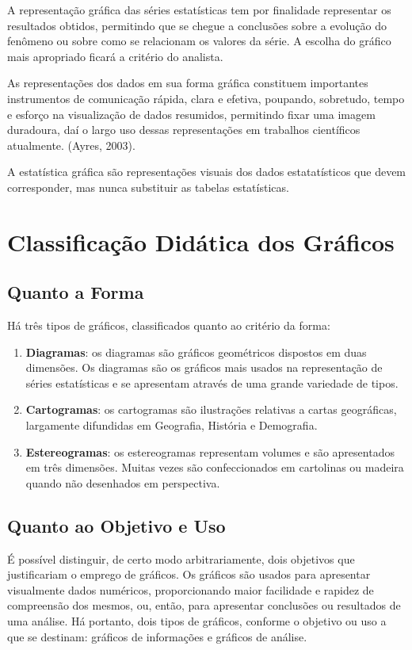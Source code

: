 A representação gráfica das séries estatísticas tem por finalidade representar os resultados obtidos, permitindo que se chegue a conclusões sobre a evolução do fenômeno ou sobre como se relacionam os valores da série. A escolha do gráfico mais apropriado ficará a critério do analista.\vskip0.3cm

As representações dos dados em sua forma gráfica constituem importantes instrumentos de comunicação rápida, clara e efetiva, poupando, sobretudo, tempo e esforço na visualização de dados resumidos, permitindo fixar uma imagem duradoura, daí o largo uso dessas representações em trabalhos científicos atualmente. (Ayres, 2003).\vskip0.3cm

A estatística gráfica são representações visuais dos dados estatatísticos que devem corresponder, mas nunca substituir as tabelas estatísticas.


\newpage
\section{Classificação Didática dos Gráficos}
\subsection{Quanto a Forma}

Há três tipos de gráficos, classificados quanto ao critério da forma:

\begin{enumerate}
  \item \textbf{Diagramas}: os diagramas são gráficos geométricos dispostos em duas dimensões. Os diagramas são os gráficos mais usados na representação de séries estatísticas e se  apresentam através de uma grande variedade de tipos.
  \item \textbf{Cartogramas}: os cartogramas são ilustrações relativas a cartas geográficas, largamente difundidas em Geografia, História e Demografia.
  \item \textbf{Estereogramas}: os estereogramas representam volumes e são apresentados em três dimensões. Muitas vezes são confeccionados em cartolinas ou madeira quando não desenhados em perspectiva.
\end{enumerate}

\subsection{Quanto ao Objetivo e Uso}

É possível distinguir, de certo modo arbitrariamente, dois objetivos que justificariam o emprego de gráficos. Os gráficos são usados para apresentar visualmente dados numéricos, proporcionando maior facilidade e rapidez de compreensão dos mesmos, ou, então, para apresentar conclusões ou resultados de uma análise. Há portanto, dois tipos de gráficos, conforme o objetivo ou uso a que se destinam: gráficos de informações e gráficos de análise.

